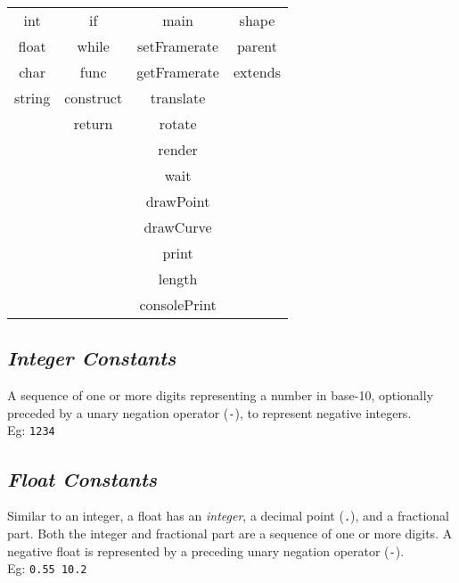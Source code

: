 \documentclass[letterpaper,12pt]{article}
\begin{document}
        \begin{center}
            \begin{tabular}{ |c|c|c|c| } 
            \hline
                int     & if            & main          & shape   \\ 
                float   & while         & setFramerate  & parent  \\ 
                char    & func          & getFramerate  & extends \\
                string  & construct     & translate     & \\
                        & return        & rotate        & \\
                        &               & render        & \\
                        &               & wait          & \\
                        &               & drawPoint     & \\
                        &               & drawCurve     & \\
                        &               & print         & \\
                        &               & length        & \\
                        &               & consolePrint  & \\

            \hline
            \end{tabular}
        \end{center}

    \subsection{\textit{Integer Constants}}
    A sequence of one or more digits representing a number in base-10, optionally preceded by a unary negation operator (\texttt{-}), to represent negative integers.\\
    Eg: \texttt{1234}

    \subsection{\textit{Float Constants}}
    Similar to an integer, a float has an \textit{integer}, a decimal point (\texttt{.}), and a fractional part. Both the integer and fractional part are a sequence of one or more digits. A negative float is represented by a preceding unary negation operator (\texttt{-}).\\
    Eg: \texttt{0.55  10.2}
\end{document}
